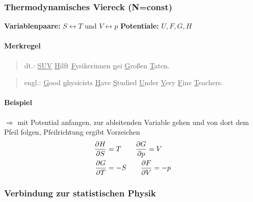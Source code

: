 \subsubsection{Thermodynamisches Viereck (N=const)}
\textbf{Variablenpaare:} $S \leftrightarrow T$ und $V \leftrightarrow p$ \textbf{Potentiale:} $U,F,G,H$
\begin{center}
\end{center}
\paragraph{Merkregel}
\begin{quote}
    dt.:  \underline{S}\underline{U}\underline{V} \underline{H}ilft \underline{F}ysikerinnen \underline{p}ei \underline{G}roßen \underline{T}aten.
\end{quote}
\begin{quote}
    engl.: \underline{G}ood \underline{p}hysicists \underline{H}ave \underline{S}tudied \underline{U}nder \underline{V}ery \underline{F}ine \underline{T}eachers.
\end{quote}
\paragraph{Beispiel}
$\Longrightarrow$ mit Potential anfangen, zur ableitenden Variable gehen und von dort dem Pfeil folgen, Pfeilrichtung ergibt Vorzeichen
\begin{align}
    \pdv{H}{S} &= T  \qquad \pdv{G}{p} = V\\
    \pdv{G}{T} &= -S \qquad \pdv{F}{V} = -p
\end{align}

\subsubsection{Verbindung zur statistischen Physik}
